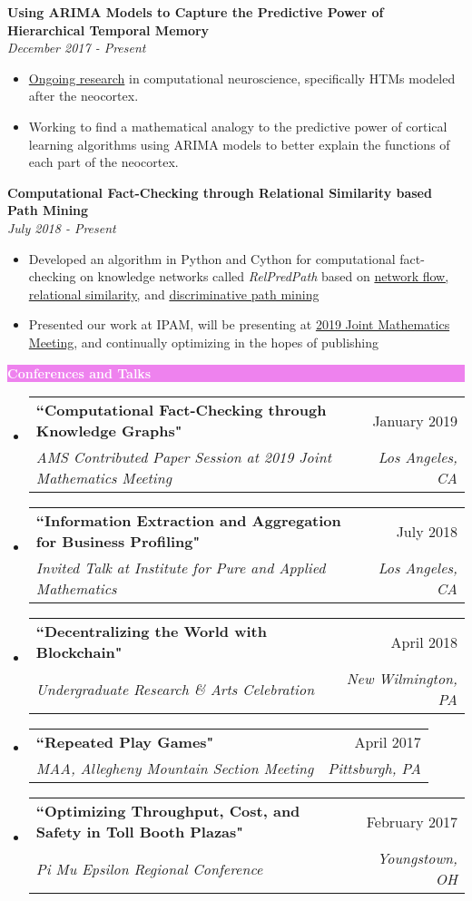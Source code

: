 \documentclass[letterpaper,11pt]{article}
\makeatletter
\newcommand{\resitem}[1]{\item #1 \vspace{-2pt}}
\newcommand{\resheading}[1]{{\large \colorbox{violet}{\begin{minipage}{\textwidth}{\textbf{#1 \vphantom{p\^{E}}}}\end{minipage}}}}
\newcommand{\ressubheading}[4]{
	\begin{tabular*}{7.0in}{l@{\extracolsep{\fill}}r}
		\textbf{#1} & #2 \\
		\textit{#3} & \textit{#4} \\
	\end{tabular*}\vspace{-6pt}}
\makeatother
\begin{document}
		\vspace{0.1in}
		
		\textbf{Using ARIMA Models to Capture the Predictive Power of Hierarchical Temporal Memory} \\ \textit{December 2017 - Present}
		\begin{itemize}[topsep=3pt, itemsep=1pt]
			\resitem{\href{https://github.com/alexandermichels/HonorsResearch}{Ongoing research} in computational neuroscience, specifically HTMs modeled after the neocortex.}
			\resitem{Working to find a mathematical analogy to the predictive power of cortical learning algorithms using ARIMA models to better explain the functions of each part of the neocortex.}
		\end{itemize}
		
		\textbf{Computational Fact-Checking through Relational Similarity based Path Mining} \\	\textit{July 2018 - Present}
		\begin{itemize}[topsep=3pt, itemsep=1pt]
			\resitem{Developed an algorithm in Python and Cython for computational fact-checking on knowledge networks called \textit{RelPredPath} based on \href{https://arxiv.org/pdf/1708.07239.pdf}{network flow, relational similarity,} and \href{https://arxiv.org/pdf/1510.05911.pdf}{discriminative path mining} }
			\resitem{Presented our work at IPAM, will be presenting at \href{https://jointmathematicsmeetings.org/meetings/national/jmm2019/2217_progfull.html?fbclid=IwAR0AccnUi\_yuX4UdnTVF-cCFVJ5lNYAdIvzw7TPS81eGXk1pn5PvQjaGyTo\#2217:AMSCP33}{2019 Joint Mathematics Meeting}, and continually optimizing in the hopes of publishing}
		\end{itemize}
	
		\resheading{\textcolor{white}{Conferences and Talks}}
		
		\begin{itemize}[topsep=3pt, itemsep=1pt]
			\item
			\ressubheading{``Computational Fact-Checking through Knowledge Graphs"}{January 2019}{AMS Contributed Paper Session at 2019 Joint Mathematics Meeting}{Los Angeles, CA}
			\item
			\ressubheading{``Information Extraction and Aggregation for Business Profiling"}{July 2018}{Invited Talk at Institute for Pure and Applied Mathematics}{Los Angeles, CA}
			\item
			\ressubheading{``Decentralizing the World with Blockchain"}{April 2018}{Undergraduate Research \& Arts Celebration}{New Wilmington, PA}
			\item
			\ressubheading{``Repeated Play Games"}{April 2017}{MAA, Allegheny Mountain Section Meeting}{Pittsburgh, PA}
			\item
			\ressubheading{``Optimizing Throughput, Cost, and Safety in Toll Booth Plazas"}{February 2017}{Pi Mu Epsilon Regional Conference}{Youngstown, OH}
			
		\end{itemize}
	
\end{document}
